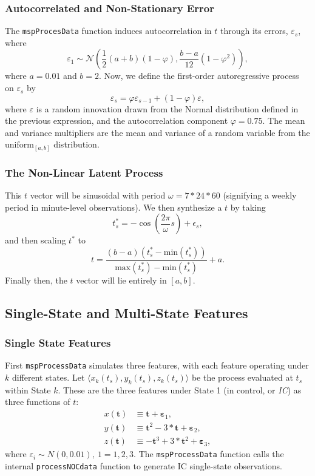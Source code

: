 \documentclass{report}\usepackage[]{graphicx}\usepackage[]{color}
\begin{document}
\subsubsection{Autocorrelated and Non-Stationary Error}
The \texttt{mspProcesData} function induces autocorrelation in $t$ through its errors, $\varepsilon_s$, where
\[
  \varepsilon_1 \sim \mathcal{N}\left(\frac{1}{2}(a + b)(1 - \varphi), \frac{b - a}{12} (1 - \varphi ^ 2)\right),
\]
where $a = 0.01$ and $b = 2$. Now, we define the first-order autoregressive process on $\varepsilon_s$ by
\[
  \varepsilon_s = \varphi\varepsilon_{s - 1} + (1 - \varphi)\varepsilon,
\]
where $\varepsilon$ is a random innovation drawn from the Normal distribution defined in the previous expression, and the autocorrelation component $\varphi = 0.75$. The mean and variance multipliers are the mean and variance of a random variable from the $\text{uniform}_{[a,b]}$ distribution.

\subsubsection{The Non-Linear Latent Process}
This $t$ vector will be sinusoidal with period $\omega = 7 * 24 * 60$ (signifying a weekly period in  minute-level observations). We then synthesize a $t$ by taking
\[
  t^*_s = -\cos\left( \frac{2\pi}{\omega} s \right) + \epsilon_s,
\]
and then scaling $t^*$ to
\[
  t = \frac{(b - a)(t^*_s - \text{min}(t^*_s))}{\text{max}(t^*_s) - \text{min}(t^*_s)} + a.
\]
Finally then, the $t$ vector will lie entirely in $[a,b]$.


\subsection{Single-State and Multi-State Features}

\subsubsection{Single State Features}
First \texttt{mspProcessData} simulates three features, with each feature operating under $k$ different states. Let $\langle x_k(t_s), y_k(t_s), z_k(t_s) \rangle$ be the process evaluated at $t_s$ within State $k$. These are the three features under State 1 (in control, or \emph{IC}) as three functions of $t$:
\begin{align}
x(\textbf{t}) &\equiv \textbf{t} + \boldsymbol\varepsilon_1, \\
y(\textbf{t}) &\equiv \textbf{t} ^ 2 - 3 * \textbf{t} + \boldsymbol\varepsilon_2, \\
z(\textbf{t}) &\equiv -\textbf{t} ^ 3 + 3 * \textbf{t} ^ 2 + \boldsymbol\varepsilon_3,
\end{align}
where $\varepsilon_i \sim N(0, 0.01),\ 1 = 1, 2, 3$. The \texttt{mspProcessData} function calls the internal \texttt{processNOCdata} function to generate IC single-state observations.
\end{document}
